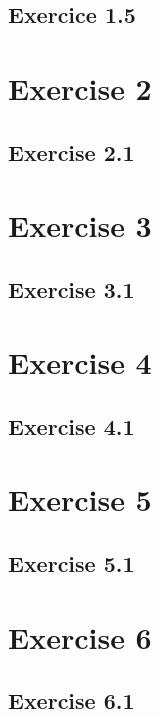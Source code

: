 \documentclass[a4paper]{article}
\begin{document}
\subsection{Exercice 1.5}

\section{Exercise 2}
\subsection{Exercise 2.1}
\indent \indent 



\section{Exercise 3}
\subsection{Exercise 3.1}
\indent \indent 



\section{Exercise 4}
\subsection{Exercise 4.1}
\indent \indent 



\section{Exercise 5}
\subsection{Exercise 5.1}
\indent \indent 



\section{Exercise 6}
\subsection{Exercise 6.1}
\indent \indent 

\end{document}
